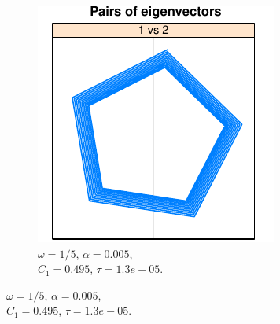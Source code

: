 \documentclass[specialist,
               substylefile = spbu.rtx,
               subf,href,colorlinks=true, 12pt]{disser}
\begin{document}
\begin{figure}[h] 
    \centering
   \begin{subfigure}[b]{0.3\textwidth}
       \includegraphics[width=\textwidth]{re_ex_mod_omega_1_5}
        \caption{$\omega=1/5$, $\alpha = 0.005$, \\$C_1 = 0.495$, $\tau =1.3e-05$.}


\end{subfigure}
\end{figure}
\end{document}
